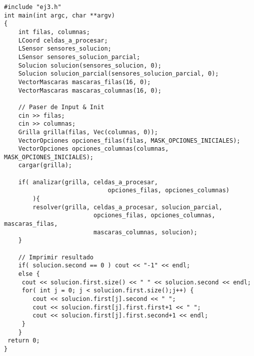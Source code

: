 \documentclass[11pt, a4paper, twoside]{article}
\begin{document}
\begin{lstlisting}
#include "ej3.h"
int main(int argc, char **argv)
{
	int filas, columnas;
	LCoord celdas_a_procesar;
	LSensor sensores_solucion;
	LSensor sensores_solucion_parcial;
	Solucion solucion(sensores_solucion, 0);
	Solucion solucion_parcial(sensores_solucion_parcial, 0);
	VectorMascaras mascaras_filas(16, 0);
	VectorMascaras mascaras_columnas(16, 0);

	// Paser de Input & Init
	cin >> filas;
	cin >> columnas;
	Grilla grilla(filas, Vec(columnas, 0));
	VectorOpciones opciones_filas(filas, MASK_OPCIONES_INICIALES);
	VectorOpciones opciones_columnas(columnas, MASK_OPCIONES_INICIALES);  
	cargar(grilla);

	if( analizar(grilla, celdas_a_procesar,
							 opciones_filas, opciones_columnas)
		){
		resolver(grilla, celdas_a_procesar, solucion_parcial,
						 opciones_filas, opciones_columnas, mascaras_filas,
						 mascaras_columnas, solucion);
	}

	// Imprimir resultado
	if( solucion.second == 0 ) cout << "-1" << endl;
	else {
	 cout << solucion.first.size() << " " << solucion.second << endl;
	 for( int j = 0; j < solucion.first.size();j++) {
		cout << solucion.first[j].second << " ";
		cout << solucion.first[j].first.first+1 << " ";
		cout << solucion.first[j].first.second+1 << endl;
	 }
	}
 return 0; 
}
\end{lstlisting}
\end{document}
